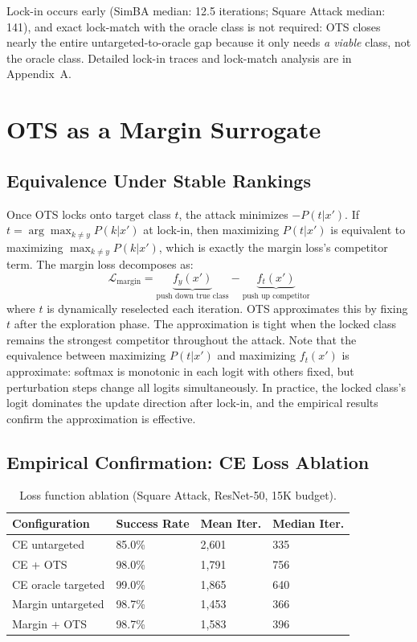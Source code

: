 \documentclass{cap2026}
\begin{document}
Lock-in occurs early (SimBA median: 12.5 iterations; Square Attack median: 141), and exact lock-match with the oracle class is not required: OTS closes nearly the entire untargeted-to-oracle gap because it only needs \textit{a viable} class, not the oracle class. Detailed lock-in traces and lock-match analysis are in Appendix~A.

\section{OTS as a Margin Surrogate}\label{sec:margin-surrogate}

\subsection{Equivalence Under Stable Rankings}\label{sec:equivalence}

Once OTS locks onto target class $t$, the attack minimizes $-P(t|x')$. If $t = \arg\max_{k \neq y} P(k|x')$ at lock-in, then maximizing $P(t|x')$ is equivalent to maximizing $\max_{k \neq y} P(k|x')$, which is exactly the margin loss's competitor term. The margin loss decomposes as:
\begin{equation}
\mathcal{L}_{\text{margin}} = \underbrace{f_y(x')}_{\text{push down true class}} - \underbrace{f_t(x')}_{\text{push up competitor}}
\end{equation}
where $t$ is dynamically reselected each iteration. OTS approximates this by fixing $t$ after the exploration phase. The approximation is tight when the locked class remains the strongest competitor throughout the attack. Note that the equivalence between maximizing $P(t|x')$ and maximizing $f_t(x')$ is approximate: softmax is monotonic in each logit with others fixed, but perturbation steps change all logits simultaneously. In practice, the locked class's logit dominates the update direction after lock-in, and the empirical results confirm the approximation is effective.

\subsection{Empirical Confirmation: CE Loss Ablation}\label{sec:loss-ablation}

\begin{table}[H]
\centering
\caption{Loss function ablation (Square Attack, ResNet-50, 15K budget).}
\label{tab:loss-ablation}
\small
\begin{tabular}{@{}llll@{}}
\toprule
Configuration & Success Rate & Mean Iter. & Median Iter. \\
\midrule
CE untargeted & 85.0\% & 2,601 & 335 \\
CE + OTS & 98.0\% & 1,791 & 756 \\
CE oracle targeted & 99.0\% & 1,865 & 640 \\
Margin untargeted & 98.7\% & 1,453 & 366 \\
Margin + OTS & 98.7\% & 1,583 & 396 \\
\bottomrule
\end{tabular}
\end{table}
\end{document}
